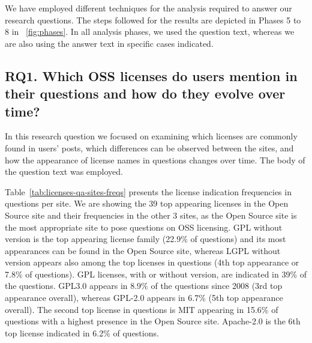 \documentclass{elsarticle}
\begin{document}
We have employed different techniques for the analysis required to answer our research questions. The steps followed for the results are depicted in Phases 5 to 8 in \figurename~\ref{fig:phases}. In all analysis phases, we used the question text, whereas we are also using the answer text in specific cases indicated.

\subsection{RQ1. Which OSS licenses do users mention in their questions and how do they evolve over time?}

In this research question we focused on examining which licenses are commonly found in users' posts, which differences can be observed between the sites, and how the appearance of license names in questions changes over time. The body of the question text was employed.

Table~\ref{tab:licenses-qa-sites-freqs} presents the license indication frequencies in questions per site. We are showing the 39 top appearing licenses in the Open Source site and their frequencies in the other 3 sites, as the Open Source site is the most appropriate site to pose questions on OSS licensing. GPL without version is the top appearing license family (22.9\% of questions) and its most appearances can be found in the Open Source site, whereas LGPL without version appears also among the top licenses in questions (4th top appearance or 7.8\% of questions). GPL licenses, with or without version, are indicated in 39\% of the questions. GPL3.0 appears in 8.9\% of the questions since 2008 (3rd top appearance overall), whereas GPL-2.0 appears in 6.7\% (5th top appearance overall). The second top license in questions is MIT appearing in 15.6\% of questions with a highest presence in the Open Source site. Apache-2.0 is the 6th top license indicated in 6.2\% of questions.
\end{document}
